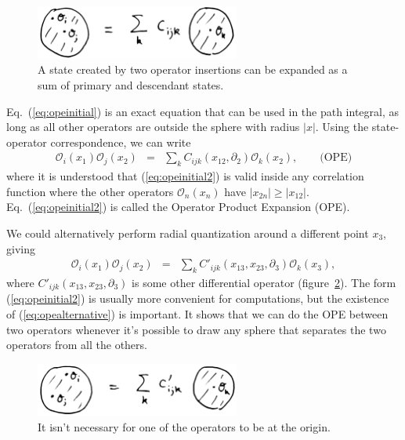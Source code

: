 \documentclass{ws-rv9x6}
\newcommand\be{\begin{eqnarray}}
\newcommand\ee{\end{eqnarray}}
\newcommand\cO{\mathcal{O}}
\newcommand\ptl\partial
\newcommand\<\langle
\renewcommand\>\rangle
\renewcommand\.{\cdot}
\begin{document}
\begin{figure}
\begin{center}
\includegraphics[width=0.6\textwidth]{ope.jpg}
\end{center}
\caption{A state created by two operator insertions can be expanded as a sum of primary and descendant states.  \label{fig:ope}}
\end{figure}

Eq.~(\ref{eq:opeinitial}) is an exact equation that can be used in the path integral, as long as all other operators are outside the sphere with radius $|x|$.  Using the state-operator correspondence, we can write
\be
\label{eq:opeinitial2}
\cO_i(x_1)\cO_j(x_2) &=& \sum_{k}C_{ijk}(x_{12},\ptl_2)\cO_k(x_2),\qquad\textrm{(OPE)}
\ee
where it is understood that (\ref{eq:opeinitial2}) is valid inside any correlation function where the other operators $\cO_n(x_n)$ have $|x_{2n}|\geq |x_{12}|$.  Eq.~(\ref{eq:opeinitial2}) is called the Operator Product Expansion (OPE).

We could alternatively perform radial quantization around a different point $x_3$, giving
\be
\label{eq:opealternative}
\cO_i(x_1)\cO_j(x_2) &=& \sum_k C'_{ijk}(x_{13},x_{23},\ptl_3)\cO_k(x_3),
\ee
where $C'_{ijk}(x_{13},x_{23},\ptl_3)$ is some other differential operator (figure~\ref{fig:radialquantotherpoint}).  The form  (\ref{eq:opeinitial2}) is usually more convenient for computations, but the existence of (\ref{eq:opealternative}) is important. It shows that we can do the OPE between two operators whenever it's possible to draw any sphere that separates the two operators from all the others.

\begin{figure}
\begin{center}
\includegraphics[width=0.6\textwidth]{radialquantotherpoint.jpg}
\end{center}
\caption{It isn't necessary for one of the operators to be at the origin.  \label{fig:radialquantotherpoint}}
\end{figure}
\end{document}
